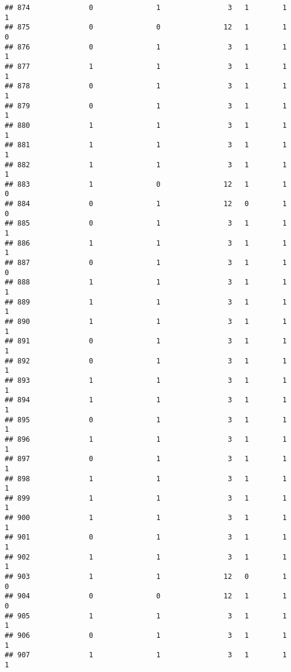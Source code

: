 \documentclass[]{article}
\begin{document}
\begin{verbatim}
## 874              0               1                3   1        1        1
## 875              0               0               12   1        1        0
## 876              0               1                3   1        1        1
## 877              1               1                3   1        1        1
## 878              0               1                3   1        1        1
## 879              0               1                3   1        1        1
## 880              1               1                3   1        1        1
## 881              1               1                3   1        1        1
## 882              1               1                3   1        1        1
## 883              1               0               12   1        1        0
## 884              0               1               12   0        1        0
## 885              0               1                3   1        1        1
## 886              1               1                3   1        1        1
## 887              0               1                3   1        1        0
## 888              1               1                3   1        1        1
## 889              1               1                3   1        1        1
## 890              1               1                3   1        1        1
## 891              0               1                3   1        1        1
## 892              0               1                3   1        1        1
## 893              1               1                3   1        1        1
## 894              1               1                3   1        1        1
## 895              0               1                3   1        1        1
## 896              1               1                3   1        1        1
## 897              0               1                3   1        1        1
## 898              1               1                3   1        1        1
## 899              1               1                3   1        1        1
## 900              1               1                3   1        1        1
## 901              0               1                3   1        1        1
## 902              1               1                3   1        1        1
## 903              1               1               12   0        1        0
## 904              0               0               12   1        1        0
## 905              1               1                3   1        1        1
## 906              0               1                3   1        1        1
## 907              1               1                3   1        1        1

\end{verbatim}
\end{document}
